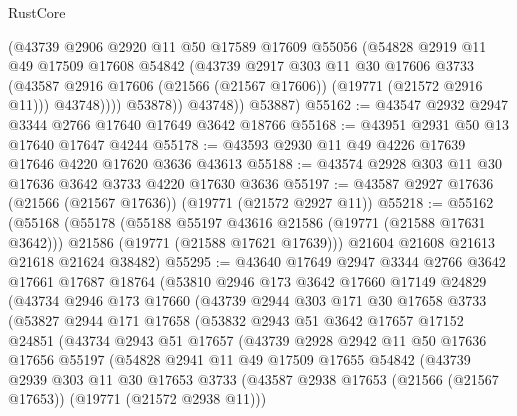\begin{lexlean}{RustCore}
\begin{coremodule}
                (@43739
                  @2906
                  @2920
                  @11
                  @50
                  @17589
                  @17609
                  @55056
                  (@54828
                    @2919
                    @11
                    @49
                    @17509
                    @17608
                    @54842
                    (@43739
                      @2917
                      @303
                      @11
                      @30
                      @17606
                      @3733
                      (@43587 @2916 @17606 (@21566 (@21567 @17606)) (@19771 (@21572 @2916 @11)))
                      @43748))))
              @53878))
          @43748))
      @53887)
@55162 := @43547 @2932 @2947 @3344 @2766 @17640 @17649 @3642 @18766
@55168 := @43951 @2931 @50 @13 @17640 @17647 @4244
@55178 := @43593 @2930 @11 @49 @4226 @17639 @17646 @4220 @17620 @3636 @43613
@55188 := @43574 @2928 @303 @11 @30 @17636 @3642 @3733 @4220 @17630 @3636
@55197 := @43587 @2927 @17636 (@21566 (@21567 @17636)) (@19771 (@21572 @2927 @11))
@55218 := @55162
    (@55168
      (@55178
        (@55188 @55197 @43616 @21586 (@19771 (@21588 @17631 @3642)))
        @21586
        (@19771 (@21588 @17621 @17639)))
      @21604
      @21608
      @21613
      @21618
      @21624
      @38482)
@55295 := @43640
    @17649
    @2947
    @3344
    @2766
    @3642
    @17661
    @17687
    @18764
    (@53810
      @2946
      @173
      @3642
      @17660
      @17149
      @24829
      (@43734
        @2946
        @173
        @17660
        (@43739
          @2944
          @303
          @171
          @30
          @17658
          @3733
          (@53827
            @2944
            @171
            @17658
            (@53832
              @2943
              @51
              @3642
              @17657
              @17152
              @24851
              (@43734
                @2943
                @51
                @17657
                (@43739
                  @2928
                  @2942
                  @11
                  @50
                  @17636
                  @17656
                  @55197
                  (@54828
                    @2941
                    @11
                    @49
                    @17509
                    @17655
                    @54842
                    (@43739
                      @2939
                      @303
                      @11
                      @30
                      @17653
                      @3733
                      (@43587 @2938 @17653 (@21566 (@21567 @17653)) (@19771 (@21572 @2938 @11)))

\end{coremodule}
\end{lexlean}
